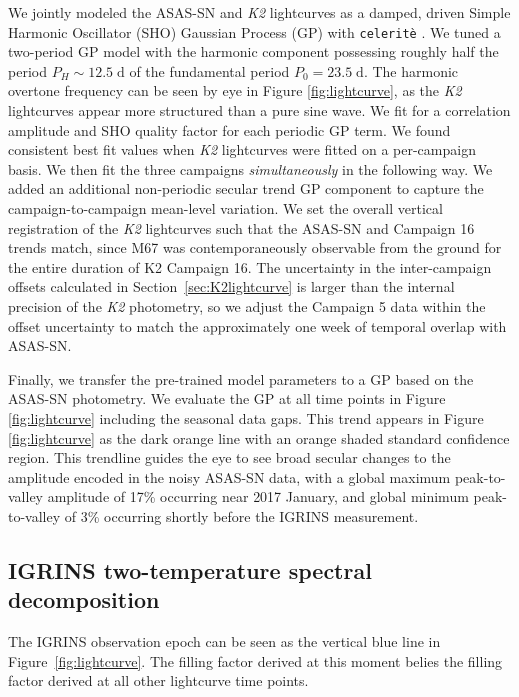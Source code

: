 \documentclass[trackchanges]{aastex631}
\begin{document}
We jointly modeled the ASAS-SN and \emph{K2} lightcurves as a damped, driven Simple Harmonic Oscillator (SHO) Gaussian Process (GP) with \texttt{celerit\`e} \citep{2017AJ....154..220F}.  We tuned a two-period GP model with the harmonic component possessing roughly half the period $P_H\sim12.5\;\mathrm{d}$ of the fundamental period $P_0=23.5\;\mathrm{d}$.  The harmonic overtone frequency can be seen by eye in Figure \ref{fig:lightcurve}, as the \emph{K2} lightcurves appear more structured than a pure sine wave.  We fit for a correlation amplitude and SHO quality factor for each periodic GP term.  We found consistent best fit values when \emph{K2} lightcurves were fitted on a per-campaign basis.  We then fit the three campaigns \emph{simultaneously} in the following way.  We added an additional non-periodic secular trend GP component to capture the campaign-to-campaign mean-level variation.  We set the overall vertical registration of the \emph{K2} lightcurves such that the ASAS-SN and Campaign 16 trends match, since M67 was contemporaneously observable from the ground for the entire duration of K2 Campaign 16. The uncertainty in the inter-campaign offsets calculated in Section~\ref{sec:K2lightcurve} is larger than the internal precision of the \emph{K2} photometry, so we adjust the Campaign 5 data within the offset uncertainty to match the approximately one week of temporal overlap with ASAS-SN.

Finally, we transfer the pre-trained model parameters to a GP based on the ASAS-SN photometry. We evaluate the GP at all time points in Figure \ref{fig:lightcurve} including the seasonal data gaps.  This trend appears in Figure \ref{fig:lightcurve} as the dark orange line with an orange shaded standard confidence region.  This trendline guides the eye to see broad secular changes to the amplitude encoded in the noisy ASAS-SN data, with a global maximum peak-to-valley amplitude of 17\% occurring near 2017 January, and global minimum peak-to-valley of 3\% occurring shortly before the IGRINS measurement.



\subsection{IGRINS two-temperature spectral decomposition}

The IGRINS observation epoch can be seen as the vertical blue line in Figure~\ref{fig:lightcurve}. The filling factor derived at this moment belies the filling factor derived at all other lightcurve time points.
\end{document}
